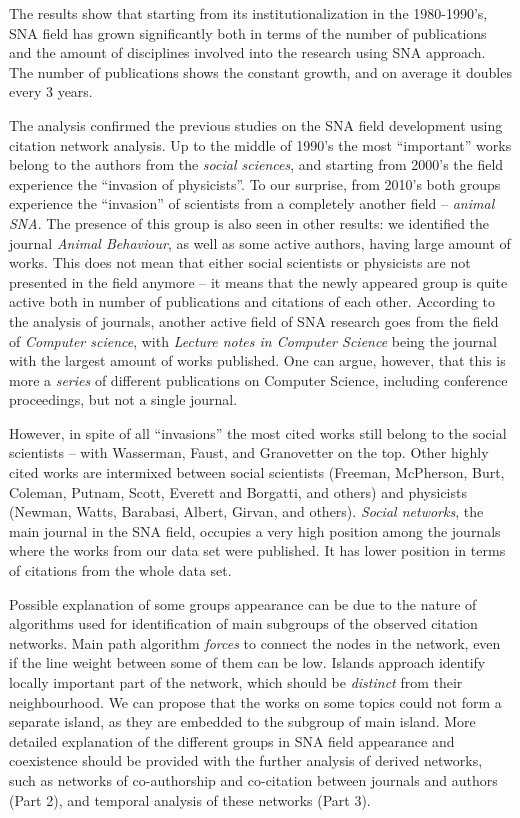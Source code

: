 \documentclass[11pt]{article} %
\begin{document}
The results show that starting from its institutionalization in the 1980-1990's, SNA field has grown significantly both in terms of the number of publications and the amount of disciplines involved into the research using SNA approach. The number of publications shows the constant growth, and on average it doubles every 3 years.  \medskip 

The analysis confirmed the previous studies on the SNA field development using citation network analysis. Up to the middle of 1990's the most ``important'' works belong to the authors from the \textit{social sciences}, and starting from 2000's the field experience the ``invasion of physicists''. To our surprise, from 2010's both groups experience the ``invasion'' of scientists from a completely another field -- \textit{animal SNA}. The presence of this group is also seen in other results: we identified the journal \textit{Animal Behaviour}, as well as some active authors, having large amount of works. This does not mean that either social scientists or physicists are not presented in the field anymore -- it means that the newly appeared group is quite active both in number of publications and citations of each other. According to the analysis of journals, another active field of SNA research goes from the field of \textit{Computer science}, with \textit{Lecture notes in Computer Science} being the journal with the largest amount of works published. One can argue, however, that this is more a \textit{series} of different publications on Computer Science, including conference proceedings, but not a single journal.\medskip 

However, in spite of all ``invasions'' the most cited works still belong to the social scientists -- with Wasserman, Faust, and Granovetter on the top. Other highly cited works are intermixed between social scientists (Freeman, McPherson, Burt, Coleman, Putnam, Scott, Everett and Borgatti, and others) and physicists (Newman, Watts, Barabasi, Albert, Girvan, and others). \textit{Social networks}, the main journal in the SNA field, occupies a very high position among the journals where the works from our data set were published. It has lower position in terms of citations from the whole data set. \medskip 

Possible explanation of some groups appearance can be due to the nature of algorithms used for identification of main subgroups of the observed citation networks. Main path algorithm \textit{forces} to connect the nodes in the network, even if the line weight between some of them can be low. Islands approach identify locally important part of the network, which should be \textit{distinct} from their neighbourhood. We can propose that the works on some topics could not form a separate island, as they are embedded to the subgroup of main island. More detailed explanation of the different groups in SNA field appearance and coexistence should be provided with the further analysis of derived networks, such as networks of co-authorship and co-citation between journals and authors (Part 2), and temporal analysis of these networks (Part 3).  \medskip 
\end{document}

